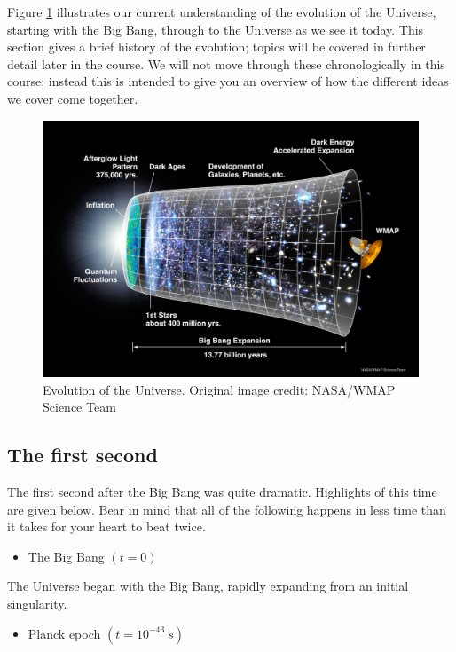 \documentclass[11pt,a4paper,notoc]{tufte-handout}
\providecommand{\tightlist}{%
  \setlength{\itemsep}{0pt}\setlength{\parskip}{0pt}}
\begin{document}
Figure \ref{fig:evo-universe} illustrates our current understanding of
the evolution of the Universe, starting with the Big Bang, through to
the Universe as we see it today. This section gives a brief history of
the evolution; topics will be covered in further detail later in the
course. We will not move through these chronologically in this course;
instead this is intended to give you an overview of how the different
ideas we cover come together.

\begin{figure}
\includegraphics[width=1\linewidth]{Images/060915_CMB_Timeline150_annotated} \caption{Evolution of the Universe. Original image credit: NASA/WMAP Science Team}\label{fig:evo-universe}
\end{figure}

\hypertarget{sec:first_second}{%
\subsection{The first second}\label{sec:first_second}}

The first second after the Big Bang was quite dramatic. Highlights of
this time are given below. Bear in mind that all of the following
happens in less time than it takes for your heart to beat twice.

\begin{itemize}
\tightlist
\item
  The Big Bang \((t = 0)\)
\end{itemize}

The Universe began with the Big Bang, rapidly expanding from an initial
singularity.

\begin{itemize}
\tightlist
\item
  Planck epoch \((t = 10^{-43}~s)\)
\end{itemize}
\end{document}
